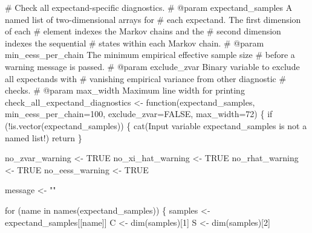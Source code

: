 \documentclass[
  letterpaper,
  DIV=11,
  numbers=noendperiod]{scrartcl}
\newenvironment{Shaded}{\begin{snugshade}}{\end{snugshade}}
\newcommand{\AttributeTok}[1]{\textcolor[rgb]{0.40,0.45,0.13}{#1}}
\newcommand{\CommentTok}[1]{\textcolor[rgb]{0.37,0.37,0.37}{#1}}
\newcommand{\ConstantTok}[1]{\textcolor[rgb]{0.56,0.35,0.01}{#1}}
\newcommand{\ControlFlowTok}[1]{\textcolor[rgb]{0.00,0.23,0.31}{#1}}
\newcommand{\DecValTok}[1]{\textcolor[rgb]{0.68,0.00,0.00}{#1}}
\newcommand{\FunctionTok}[1]{\textcolor[rgb]{0.28,0.35,0.67}{#1}}
\newcommand{\NormalTok}[1]{\textcolor[rgb]{0.00,0.23,0.31}{#1}}
\newcommand{\OtherTok}[1]{\textcolor[rgb]{0.00,0.23,0.31}{#1}}
\newcommand{\SpecialCharTok}[1]{\textcolor[rgb]{0.37,0.37,0.37}{#1}}
\newcommand{\StringTok}[1]{\textcolor[rgb]{0.13,0.47,0.30}{#1}}
\begin{document}
\begin{Shaded}
\begin{Highlighting}[]
\CommentTok{\# Check all expectand{-}specific diagnostics.}
\CommentTok{\# @param expectand\_samples A named list of two{-}dimensional arrays for }
\CommentTok{\#                          each expectand.  The first dimension of each}
\CommentTok{\#                          element indexes the Markov chains and the }
\CommentTok{\#                          second dimension indexes the sequential }
\CommentTok{\#                          states within each Markov chain.}
\CommentTok{\# @param min\_eess\_per\_chain The minimum empirical effective sample size}
\CommentTok{\#                           before a warning message is passed.}
\CommentTok{\# @param exclude\_zvar Binary variable to exclude all expectands with}
\CommentTok{\#                     vanishing empirical variance from other diagnostic}
\CommentTok{\#                     checks.}
\CommentTok{\# @param max\_width Maximum line width for printing}
\NormalTok{check\_all\_expectand\_diagnostics }\OtherTok{\textless{}{-}} \ControlFlowTok{function}\NormalTok{(expectand\_samples,}
                                            \AttributeTok{min\_eess\_per\_chain=}\DecValTok{100}\NormalTok{,}
                                            \AttributeTok{exclude\_zvar=}\ConstantTok{FALSE}\NormalTok{,}
                                            \AttributeTok{max\_width=}\DecValTok{72}\NormalTok{) \{}
  \ControlFlowTok{if}\NormalTok{ (}\SpecialCharTok{!}\FunctionTok{is.vector}\NormalTok{(expectand\_samples)) \{}
    \FunctionTok{cat}\NormalTok{(}\StringTok{\textquotesingle{}Input variable \textasciigrave{}expectand\_samples\textasciigrave{} is not a named list!\textquotesingle{}}\NormalTok{)}
\NormalTok{    return}
\NormalTok{  \}}

\NormalTok{  no\_zvar\_warning }\OtherTok{\textless{}{-}} \ConstantTok{TRUE}
\NormalTok{  no\_xi\_hat\_warning }\OtherTok{\textless{}{-}} \ConstantTok{TRUE}
\NormalTok{  no\_rhat\_warning }\OtherTok{\textless{}{-}} \ConstantTok{TRUE}
\NormalTok{  no\_eess\_warning }\OtherTok{\textless{}{-}} \ConstantTok{TRUE}

\NormalTok{  message }\OtherTok{\textless{}{-}} \StringTok{""}

  \ControlFlowTok{for}\NormalTok{ (name }\ControlFlowTok{in} \FunctionTok{names}\NormalTok{(expectand\_samples)) \{}
\NormalTok{    samples }\OtherTok{\textless{}{-}}\NormalTok{ expectand\_samples[[name]]}
\NormalTok{    C }\OtherTok{\textless{}{-}} \FunctionTok{dim}\NormalTok{(samples)[}\DecValTok{1}\NormalTok{]}
\NormalTok{    S }\OtherTok{\textless{}{-}} \FunctionTok{dim}\NormalTok{(samples)[}\DecValTok{2}\NormalTok{]}
    

\end{Highlighting}
\end{Shaded}
\end{document}
